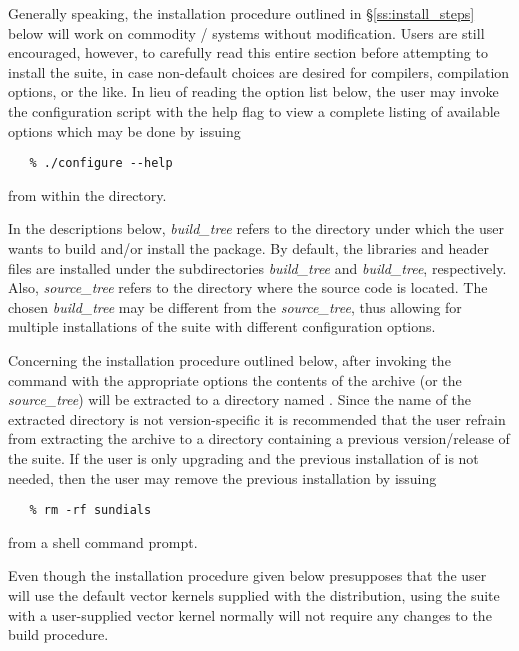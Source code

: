 Generally speaking, the installation procedure outlined in
\S\ref{ss:install_steps} below will work on commodity {\linux}/{\unix} systems
without modification. Users are still encouraged, however, to carefully read
this entire section before attempting to install the {\sundials} suite, in case
non-default choices are desired for compilers, compilation options, or the like.
In lieu of reading the option list below, the user may invoke the configuration
script with the help flag to view a complete listing of available options which
may be done by issuing 
\begin{verbatim}
   % ./configure --help 
\end{verbatim}
from within the  directory.

In the descriptions below, {\em build\_tree} refers to the directory under
which the user wants to build and/or install the {\sundials} package. By
default, the {\sundials} libraries and header files are installed under the
subdirectories {\em build\_tree} and {\em build\_tree},
respectively. Also, {\em source\_tree} refers to the directory where the
{\sundials} source code is located. The chosen {\em build\_tree} may be
different from the {\em source\_tree}, thus allowing for multiple installations
of the {\sundials} suite with different configuration options.

Concerning the installation procedure outlined below, after invoking the
 command with the appropriate options the contents of the
{\sundials} archive (or the {\em source\_tree}) will be extracted to a
directory named . Since the name of the extracted directory
is not version-specific it is recommended that the user refrain from
extracting the archive to a directory containing a previous version/release
of the {\sundials} suite. If the user is only upgrading and the previous 
installation of {\sundials} is not needed, then the user may remove the
previous installation by issuing 
\begin{verbatim}
   % rm -rf sundials
\end{verbatim}
from a shell command prompt.

Even though the installation procedure given below presupposes that the user
will use the default vector kernels supplied with the distribution, using the
{\sundials} suite with a user-supplied vector kernel normally will not require
any changes to the build procedure.  


